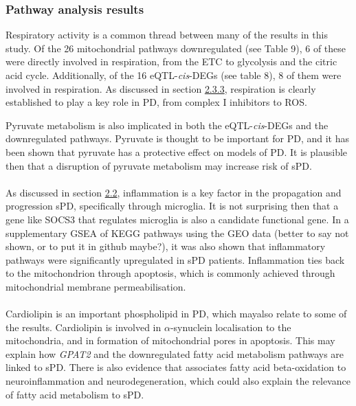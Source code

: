 \documentclass{article}
\begin{document}
\subsubsection{Pathway analysis results}
Respiratory activity is a common thread between many of the results in this study. Of the 26 mitochondrial pathways downregulated (see Table 9), 6 of these were directly involved in respiration, from the ETC to glycolysis and the citric acid cycle. Additionally, of the 16 eQTL-\textit{cis}-DEGs (see table 8), 8 of them were involved in respiration. As discussed in section \hyperref[para:oxidative]{2.3.3}, respiration is clearly established to play a key role in PD, from complex I inhibitors\cite{Langston1983ChronicSynthesis} to ROS\cite{Subramaniam2013MitochondrialDisease}.

Pyruvate metabolism is also implicated in both the eQTL-\textit{cis}-DEGs and the downregulated pathways. Pyruvate is thought to be important for PD\cite{Gray2014RegulationDisease}, and it has been shown that pyruvate has a protective effect on models of PD\cite{Kim2022PyruvateDisease}. It is plausible then that a disruption of pyruvate metabolism may increase risk of sPD.
\\
\\As discussed in section \hyperref[subsec:inflammation]{2.2}, inflammation is a key factor in the propagation and progression sPD, specifically through microglia\cite{Isik2023MicrogliaDisease}. It is not surprising then that a gene like SOCS3 that regulates microglia\cite{Wang2024SOCS3Macrophages} is also a candidate functional gene. In a supplementary GSEA of KEGG pathways using the GEO data (better to say not shown, or to put it in github maybe?), it was also shown that inflammatory pathways were significantly upregulated in sPD patients. Inflammation ties back to the mitochondrion through apoptosis\cite{Vringer2023MitochondriaInflammation}, which is commonly achieved through mitochondrial membrane permeabilisation.
\\
\\Cardiolipin is an important phospholipid in PD, which mayalso relate to some of the results. Cardiolipin is involved in $\alpha$-synuclein localisation to the mitochondria\cite{Ghio2016InteractionCardiolipin}, and in formation of mitochondrial pores in apoptosis\cite{Vringer2023MitochondriaInflammation}. This may explain how \textit{GPAT2} and the downregulated fatty acid metabolism pathways are linked to sPD. There is also evidence that associates fatty acid beta-oxidation to neuroinflammation and neurodegeneration\cite{Bogie2020FattyDisorders}, which could also explain the relevance of fatty acid metabolism to sPD.
\end{document}
